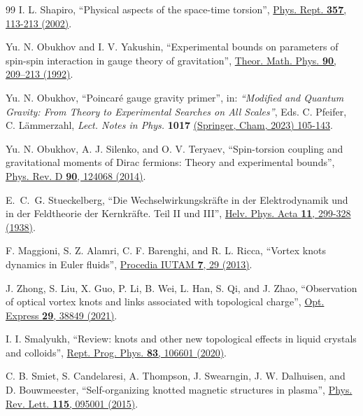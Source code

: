 \documentclass[12pt,prd,showkeys,amsmath,amssymb,nofootinbib]{revtex4-1}
\begin{document}
\begin{thebibliography}{99}
I. L. Shapiro, ``Physical aspects of the space-time torsion'',
\href{https://doi.org/10.1016/S0370-1573(01)00030-8}{Phys. Rept. {\bf 357}, 113-213 (2002)}.

Yu. N. Obukhov and I. V. Yakushin, ``Experimental bounds on parameters of spin-spin interaction
in gauge theory of gravitation'',
\href{https://doi.org/10.1007/BF01028446}{Theor. Math. Phys. {\bf 90}, 209–213 (1992)}. 

Yu. N. Obukhov, ``Poincar\'e gauge gravity primer'', in: {\sl ``Modified and Quantum Gravity:
From Theory to Experimental Searches on All Scales''}, Eds. C. Pfeifer, C. L\"ammerzahl,
{\sl Lect. Notes in Phys.} {\bf 1017}
\href{https://doi.org/10.1007/978-3-031-31520-6_3}{(Springer, Cham, 2023) 105-143}.
  
Yu. N. Obukhov, A. J. Silenko, and O. V. Teryaev, ``Spin-torsion coupling and gravitational
moments of Dirac fermions: Theory and experimental bounds'',
\href{https://doi.org/10.1103/PhysRevD.90.124068}{Phys. Rev. D {\bf 90}, 124068 (2014)}.

E.~C.~G. Stueckelberg, ``Die Wechselwirkungskr\"afte in der Elektrodynamik und in der
Feldtheorie der Kernkr\"afte. Teil II und III'',
\href{http://doi.org/10.5169/seals-110855}{Helv. Phys. Acta {\bf 11}, 299-328 (1938)}. 

F. Maggioni, S. Z. Alamri, C. F. Barenghi, and R. L. Ricca, ``Vortex knots dynamics in Euler fluids'',
\href{https://doi.org/https://doi.org/10.1016/j.piutam.2013.03.005}{Procedia IUTAM {\bf 7}, 29 (2013)}.

J. Zhong, S. Liu, X. Guo, P. Li, B. Wei, L. Han, S. Qi, and J. Zhao,
``Observation of optical vortex knots and links associated with topological charge'',
\href{https://doi.org/10.1364/OE.441263}{Opt. Express {\bf 29}, 38849 (2021)}. 

I. I. Smalyukh, ``Review: knots and other new topological effects in liquid crystals and colloids'', 
\href{https://doi.org/10.1088/1361-6633/abaa39}{Rept. Prog. Phys. {\bf 83}, 106601 (2020)}.

C. B. Smiet, S. Candelaresi, A. Thompson, J. Swearngin, J. W. Dalhuisen, and D. Bouwmeester,
``Self-organizing knotted magnetic structures in plasma'',
\href{https://doi.org/10.1103/PhysRevLett.115.095001}{Phys. Rev. Lett. {\bf 115}, 095001 (2015)}.


\end{thebibliography}
\end{document}
